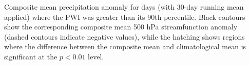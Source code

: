 \label{fig:pr_composite}
Composite mean precipitation anomaly for days (with 30-day running mean applied) where the PWI was greater than its 90th percentile. Black contours show the corresponding composite mean 500 hPa streamfunction anomaly (dashed contours indicate negative values), while the hatching shows regions where the difference between the composite mean and climatological mean is significant at the $p < 0.01$ level.